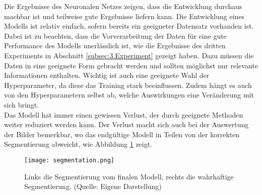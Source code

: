 Die Ergebnisse des Neuronalen Netzes zeigen, dass die Entwicklung durchaus machbar ist und teilweise gute Ergebnisse liefern kann. Die Entwicklung eines Modells ist relativ einfach, sofern bereits ein geeigneter Datensatz vorhanden ist. \\
Dabei ist zu beachten, dass die Vorverarbeitung der Daten für eine gute Performance des Modells unerlässlich ist, wie die Ergebnisse des dritten Experiments in Abschnitt \ref{subsec:3.Experiment} gezeigt haben. Dazu müssen die Daten in eine geeignete Form gebracht werden und sollten möglichst nur relevante Informationen enthalten. Wichtig ist auch eine geeignete Wahl der Hyperparameter, da diese das Training stark beeinflussen. Zudem hängt es auch von den Hyperparametern selbst ab, welche Auswirkungen eine Veränderung mit sich bringt.\\
Das Modell hat immer einen gewissen Verlust, der durch geeignete Methoden weiter reduziert werden kann. Der Verlust macht sich auch bei der Auswertung der Bilder bemerkbar, wo das endgültige Modell in Teilen von der korrekten Segmentierung abweicht, wie Abbildung \ref{fig:segmentation} zeigt.


\begin{figure}
	\centering
	\texttt{[image: segmentation.png]}
	\caption{Links die Segmentierung vom finalen Modell, rechts die wahrhaftige Segmentierung. (Quelle: Eigene Darstellung)}
	\label{fig:segmentation}
\end{figure}